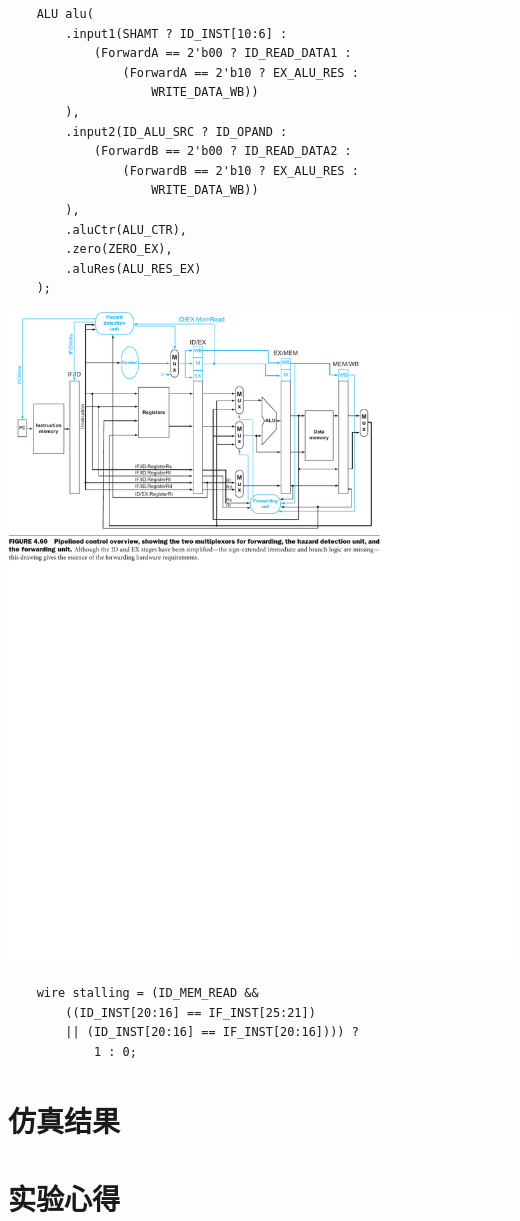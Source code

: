 \documentclass[a4paper,UTF8]{ctexart}
\begin{document}
\begin{verbatim}
    ALU alu(
        .input1(SHAMT ? ID_INST[10:6] : 
            (ForwardA == 2'b00 ? ID_READ_DATA1 :
                (ForwardA == 2'b10 ? EX_ALU_RES : 
                    WRITE_DATA_WB))
        ),
        .input2(ID_ALU_SRC ? ID_OPAND : 
            (ForwardB == 2'b00 ? ID_READ_DATA2 :
                (ForwardB == 2'b10 ? EX_ALU_RES :
                    WRITE_DATA_WB))
        ),
        .aluCtr(ALU_CTR),
        .zero(ZERO_EX),
        .aluRes(ALU_RES_EX)
    );
\end{verbatim}

\includegraphics[width=\textwidth]{stall.pdf}

\begin{verbatim}
    wire stalling = (ID_MEM_READ && 
        ((ID_INST[20:16] == IF_INST[25:21]) 
        || (ID_INST[20:16] == IF_INST[20:16]))) ? 
            1 : 0;
\end{verbatim}

\section{仿真结果}


\section{实验心得}
\end{document}
